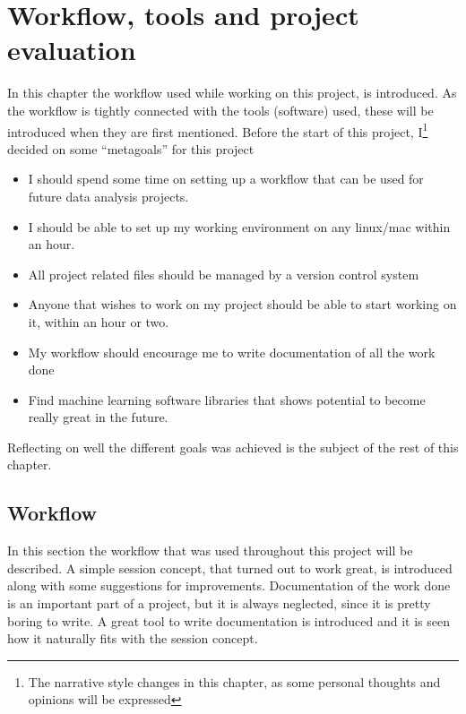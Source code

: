 \chapter{Workflow, tools and project evaluation}\label{chp:tools}
In this chapter the workflow used while working on this project, is introduced. As the workflow is tightly connected with the tools (software) used, these will be introduced when they are first mentioned. Before the start of this project, I\footnote{The narrative style changes in this chapter, as some personal thoughts and opinions will be expressed} decided on some ``metagoals'' for this project
\begin{itemize}
    \item I should spend some time on setting up a workflow that can be used for future data analysis projects.
    \item I should be able to set up my working environment on any linux/mac within an hour.
    \item All project related files should be managed by a version control system
    \item Anyone that wishes to work on my project should be able to start working on it, within an hour or two.
    \item My workflow should encourage me to write documentation of all the work done
    \item Find machine learning software libraries that shows potential to become really great in the future.
\end{itemize}
Reflecting on well the different goals was achieved is the subject of the rest of this chapter.


\section{Workflow}
In this section the workflow that was used throughout this project will be described. A simple session concept, that turned out to work great, is introduced along with some suggestions for improvements. Documentation of the work done is an important part of a project, but it is always neglected, since it is pretty boring to write. A great tool to write documentation is introduced and it is seen how it naturally fits with the session concept.

